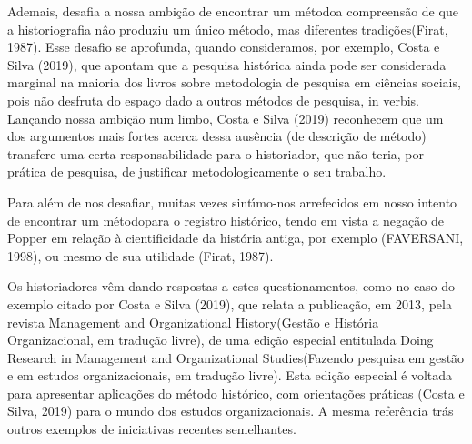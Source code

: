\documentclass[
12pt,		%
openright,	%
twoside,  %
a4paper,			%
chapter=TITLE,		%
english,			%
french,				%
spanish,			%
brazil				%
]{USPSC-classe/USPSC}
\begin{document}
Ademais, desafia a nossa ambi\c{c}\~ao de \textquotedbl encontrar um m\'etodo\textquotedbl  a compreens\~ao de que a \textquotedbl historiografia n\^ao produziu um \'unico m\'etodo, mas diferentes tradi\c{c}\~oes\textquotedbl   (Firat, 1987).  Esse desafio se aprofunda, quando consideramos, por exemplo, Costa e Silva (2019), que apontam que a \textquotedbl pesquisa hist\'orica ainda pode ser considerada marginal na maioria dos livros sobre metodologia de pesquisa em ci\^encias sociais, pois n\~ao desfruta do espa\c{c}o dado a outros m\'etodos de pesquisa\textquotedbl , in verbis. Lan\c{c}ando nossa ambi\c{c}\~ao num limbo,  Costa e Silva (2019) reconhecem \textquotedbl que um dos argumentos mais fortes acerca dessa aus\^encia (de descri\c{c}\~ao de m\'etodo) transfere uma certa responsabilidade para o historiador, que n\~ao teria, por pr\'atica de pesquisa, de justificar metodologicamente o seu trabalho\textquotedbl .










Para al\'em de nos desafiar, muitas vezes sint\'{\i}mo-nos arrefecidos em nosso intento de \textquotedbl encontrar um m\'etodo\textquotedbl  para o registro hist\'orico, tendo em vista a nega\c{c}\~ao de Popper em rela\c{c}\~ao \`a cientificidade da hist\'oria antiga, por exemplo (FAVERSANI, 1998), ou mesmo de sua utilidade (Firat, 1987).










Os historiadores v\^em dando respostas a estes questionamentos, como no caso do exemplo citado por  Costa e Silva (2019), que relata a publica\c{c}\~ao, em 2013, pela revista \textquotedbl Management and Organizational History\textquotedbl  (\textquotedbl Gest\~ao e Hist\'oria Organizacional\textquotedbl , em tradu\c{c}\~ao livre), de uma edi\c{c}\~ao especial entitulada \textquotedbl Doing Research in Management and Organizational Studies\textquotedbl  (\textquotedbl Fazendo pesquisa em gest\~ao e em estudos organizacionais\textquotedbl , em tradu\c{c}\~ao livre). Esta edi\c{c}\~ao especial \'e voltada para apresentar aplica\c{c}\~oes do m\'etodo hist\'orico, com orienta\c{c}\~oes pr\'aticas  (Costa e Silva, 2019) para o mundo dos estudos organizacionais. A mesma refer\^encia tr\'as outros exemplos de iniciativas recentes semelhantes.
\end{document}
